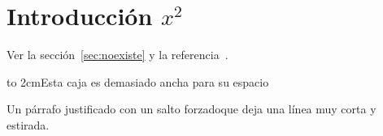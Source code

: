 \documentclass[11pt]{article}
\begin{document}
\section{Introducción $x^2$}
Ver la sección~\ref{sec:noexiste} y la referencia~\cite{nadie2026}.

\noindent\hbox to 2cm{Esta caja es demasiado ancha para su espacio}

Un párrafo justificado con un salto forzado\linebreak[4] que deja una línea muy corta y estirada.\par
\end{document}
